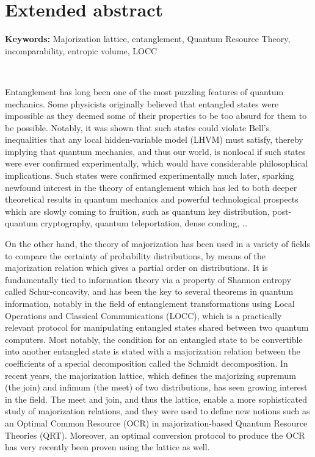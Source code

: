 \section*{Extended abstract}

\textbf{Keywords:} Majorization lattice, entanglement, Quantum Resource Theory, incomparability, entropic volume, LOCC

~

Entanglement has long been one of the most puzzling features of quantum mechanics. Some physicists originally believed that entangled states were impossible as they deemed some of their properties to be too absurd for them to be possible. Notably, it was shown that such states could violate Bell's inequalities that any local hidden-variable model (LHVM) must satisfy, thereby implying that quantum mechanics, and thus our world, is nonlocal if such states were ever confirmed experimentally, which would have considerable philosophical implications. Such states were confirmed experimentally much later, sparking newfound interest in the theory of entanglement which has led to both deeper theoretical results in quantum mechanics and powerful technological prospects which are slowly coming to fruition, such as quantum key distribution, post-quantum cryptography, quantum teleportation, dense conding, \dots

On the other hand, the theory of majorization has been used in a variety of fields to compare the certainty of probability distributions, by means of the majorization relation which gives a partial order on distributions. It is fundamentally tied to information theory via a property of Shannon entropy called Schur-concavity, and has been the key to several theorems in quantum information, notably in the field of entanglement transformations using Local Operations and Classical Communications (LOCC), which is a practically relevant protocol for manipulating entangled states shared between two quantum computers. Most notably, the condition for an entangled state to be convertible into another entangled state is stated with a majorization relation between the coefficients of a special decomposition called the Schmidt decomposition. In recent years, the majorization lattice, which defines the majorizing supremum (the join) and infimum (the meet) of two distributions, has seen growing interest in the field. The meet and join, and thus the lattice, enable a more sophisticated study of majorization relations, and they were used to define new notions such as an Optimal Common Resource (OCR) in majorization-based Quantum Resource Theories (QRT). Moreover, an optimal conversion protocol to produce the OCR has very recently been proven using the lattice as well.

